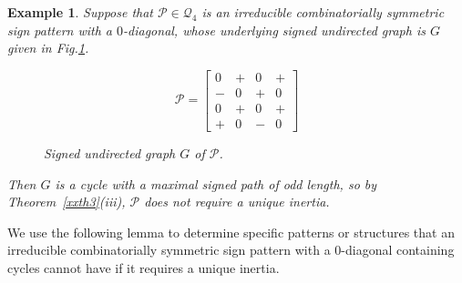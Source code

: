 \documentclass[10pt,a4paper]{amsart}
\newtheorem{eg}{Example}[section]
\numberwithin{equation}{section}
\begin{document}
\begin{eg}\label{xxeg3.9} Suppose that $\mathcal{P}\in \mathcal{Q}_4$ is an irreducible combinatorially symmetric sign pattern with a $0$-diagonal, whose underlying signed undirected graph is $G$ given in Fig.\ref{xnfig2}.
	
	\begin{figure}[H]
		\centering
		\begin{minipage}{.45\textwidth}
			\vspace{-1cm}
			\[
			\mathcal{P}=
			\begin{bmatrix}
				0 & + & 0 & + \\
				- & 0 & + & 0 \\
				0 & + & 0 & + \\
				+ & 0 & - & 0
			\end{bmatrix}
			\]
		\end{minipage}
		\hspace{0.05\textwidth}
		\begin{minipage}{.45\textwidth}
			\centering
			\tikzset{node distance=1cm}
			\caption{Signed undirected graph $ G$ of $\mathcal{P}$.}
			\label{xnfig2}
		\end{minipage}
	\end{figure}
	Then $G$ is a cycle with a maximal signed path of odd length, so by Theorem~\ref{xxth3}(iii), $\mathcal{P}$ does not require a unique inertia.
\end{eg}





We use the following lemma to determine specific patterns or structures that an irreducible combinatorially symmetric sign pattern with a $0$-diagonal containing cycles cannot have if it requires a unique inertia.

\end{document}
